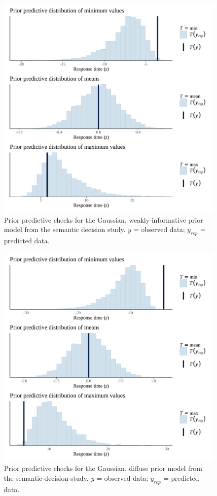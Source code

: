 \documentclass[
  12pt,
  man,floatsintext]{apa7}
\begin{document}
\begin{figure}

{\centering \includegraphics[width=0.8\linewidth]{../semanticdecision/bayesian_analysis/prior_predictive_checks/plots/semanticdecision_priorpredictivecheck_weaklyinformativepriors} 

}

\caption{Prior predictive checks for the Gaussian, weakly-informative prior model from the semantic decision study. \(y\) = observed data; \(y_{rep}\) = predicted data.}\label{fig:semanticdecision-priorpredictivecheck-weaklyinformativepriors}
\end{figure}



\begin{figure}

{\centering \includegraphics[width=0.8\linewidth]{../semanticdecision/bayesian_analysis/prior_predictive_checks/plots/semanticdecision_priorpredictivecheck_diffusepriors} 

}

\caption{Prior predictive checks for the Gaussian, diffuse prior model from the semantic decision study. \(y\) = observed data; \(y_{rep}\) = predicted data.}\label{fig:semanticdecision-priorpredictivecheck-diffusepriors}
\end{figure}
\end{document}
